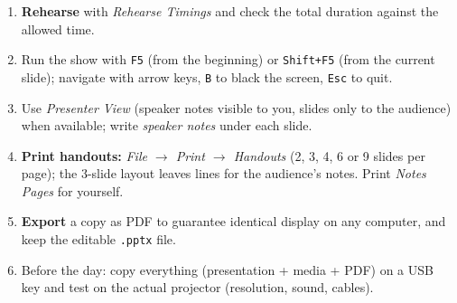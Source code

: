 \documentclass[11pt]{article}
\newcommand{\cle}[1]{{\popxbold\color{popdark}#1}}
\begin{document}
\begin{methode}
\begin{enumerate}
\item \textbf{Rehearse} with \emph{Rehearse Timings} and check the total duration against the allowed time.
\item Run the show with \texttt{F5} (from the beginning) or \texttt{Shift+F5} (from the current slide); navigate with arrow keys, \texttt{B} to black the screen, \texttt{Esc} to quit.
\item Use \emph{Presenter View} (speaker notes visible to you, slides only to the audience) when available; write \emph{speaker notes} under each slide.
\item \textbf{Print handouts:} \emph{File $\rightarrow$ Print $\rightarrow$ Handouts} (2, 3, 4, 6 or 9 slides per page); the 3-slide layout leaves lines for the audience's notes. Print \emph{Notes Pages} for yourself.
\item \textbf{Export} a copy as \cle{PDF} to guarantee identical display on any computer, and keep the editable \texttt{.pptx} file.
\item Before the day: copy everything (presentation + media + PDF) on a USB key and test on the actual projector (resolution, sound, cables).
\end{enumerate}
\end{methode}
\end{document}
